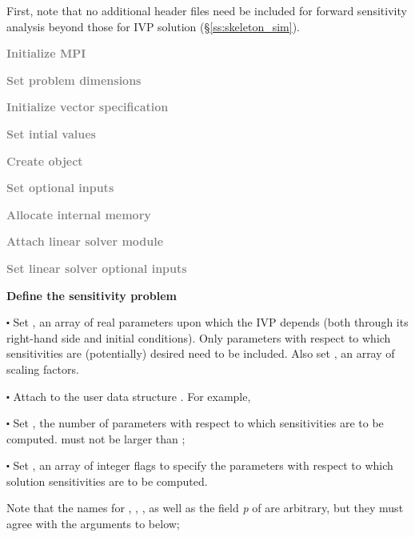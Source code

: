 First, note that no additional header files need be included for forward sensitivity 
analysis beyond those for IVP solution (\S\ref{ss:skeleton_sim}).
\begin{Steps}
  
\item 
  \textcolor{gray}{\bf {\p} Initialize MPI}

\item
  \textcolor{gray}{\bf Set problem dimensions}

\item
  \textcolor{gray}{\bf Initialize vector specification}

\item
  \textcolor{gray}{\bf Set intial values}
 
\item
  \textcolor{gray}{\bf Create {\cvodes} object}

\item
  \textcolor{gray}{\bf Set optional inputs}

\item
  \textcolor{gray}{\bf Allocate internal memory}

\item
  \textcolor{gray}{\bf Attach linear solver module}

\item
  \textcolor{gray}{\bf Set linear solver optional inputs}

\item \label{i:fwd_start}
  {\bf Define the sensitivity problem}

  $\centerdot$ Set , an array of  real parameters upon which the IVP depends 
  (both through its right-hand side and initial conditions). Only parameters
  with respect to which sensitivities are (potentially) desired need to 
  be included. Also set , an array of  scaling factors.
  
  $\centerdot$ Attach  to the user data structure . 
  For example, 
  
  $\centerdot$ Set , the number of parameters with respect to which sensitivities
  are to be computed.  must not be larger than ;
  
  $\centerdot$ Set , an array of  integer flags to specify the parameters
   with respect to which solution sensitivities are to be computed.
  
  Note that the names for , , , as well as the field
  {\em p} of  are arbitrary, but they must agree with the arguments
  to  below;


\end{Steps}
